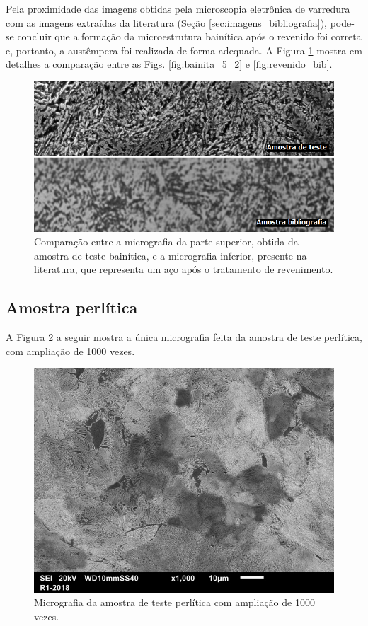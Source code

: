 \documentclass[
12pt,
openany, %
oneside, %
a4paper,			
english,			
brazil			        %
]{abntbibufjf}
\begin{document}
	Pela proximidade das imagens obtidas pela microscopia eletrônica de varredura com as imagens extraídas da literatura (Seção \ref{sec:imagens_bibliografia}), pode-se concluir que a formação da microestrutura bainítica após o revenido foi correta e, portanto, a austêmpera foi realizada de forma adequada. A Figura \ref{fig:comparacao_bainita} mostra em detalhes a comparação entre as Figs. \ref{fig:bainita_5_2} e \ref{fig:revenido_bib}.
	
	\begin{figure}[H]
		\centering
		\includegraphics[width=1\textwidth]{comparacao_bainita}
		\caption{Comparação entre a micrografia da parte superior, obtida da amostra de teste bainítica, e a micrografia inferior, presente na literatura, que representa um aço após o tratamento de revenimento.}
		\label{fig:comparacao_bainita}
	\end{figure}

\pagebreak
\subsection{Amostra perlítica}
\label{sec:micrografia_perlita}
	
	A Figura \ref{fig:perlita1000x} a seguir mostra a única micrografia feita da amostra de teste perlítica, com ampliação de 1000 vezes.
	
	\begin{figure}[H]
		\centering
		\includegraphics[width=1\textwidth]{perlita1000x}
		\caption{Micrografia da amostra de teste perlítica com ampliação de 1000 vezes.}
		\label{fig:perlita1000x}
	\end{figure}
\end{document}
